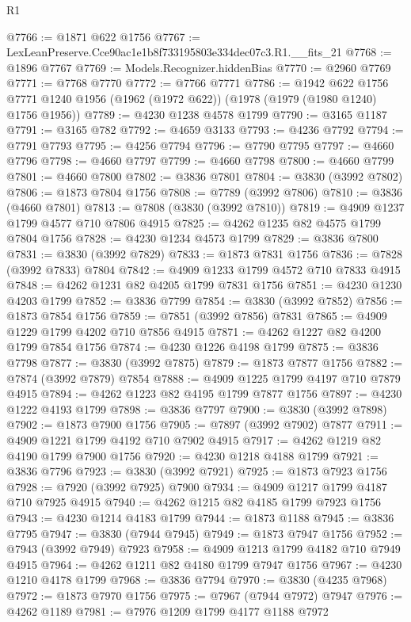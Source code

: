 \begin{lexlean}{R1}
\begin{coremodule}
@7766 := @1871 @622 @1756
@7767 := LexLeanPreserve.Cce90ac1e1b8f733195803e334dec07c3.R1.__fits_21
@7768 := @1896 @7767
@7769 := Models.Recognizer.hiddenBias
@7770 := @2960 @7769
@7771 := @7768 @7770
@7772 := @7766 @7771
@7786 := @1942
    @622
    @1756
    @7771
    @1240
    @1956
    (@1962 (@1972 @622))
    (@1978 (@1979 (@1980 @1240) @1756 @1956))
@7789 := @4230 @1238 @4578 @1799
@7790 := @3165 @1187
@7791 := @3165 @782
@7792 := @4659 @3133
@7793 := @4236 @7792
@7794 := @7791 @7793
@7795 := @4256 @7794
@7796 := @7790 @7795
@7797 := @4660 @7796
@7798 := @4660 @7797
@7799 := @4660 @7798
@7800 := @4660 @7799
@7801 := @4660 @7800
@7802 := @3836 @7801
@7804 := @3830 (@3992 @7802)
@7806 := @1873 @7804 @1756
@7808 := @7789 (@3992 @7806)
@7810 := @3836 (@4660 @7801)
@7813 := @7808 (@3830 (@3992 @7810))
@7819 := @4909 @1237 @1799 @4577 @710 @7806 @4915
@7825 := @4262 @1235 @82 @4575 @1799 @7804 @1756
@7828 := @4230 @1234 @4573 @1799
@7829 := @3836 @7800
@7831 := @3830 (@3992 @7829)
@7833 := @1873 @7831 @1756
@7836 := @7828 (@3992 @7833) @7804
@7842 := @4909 @1233 @1799 @4572 @710 @7833 @4915
@7848 := @4262 @1231 @82 @4205 @1799 @7831 @1756
@7851 := @4230 @1230 @4203 @1799
@7852 := @3836 @7799
@7854 := @3830 (@3992 @7852)
@7856 := @1873 @7854 @1756
@7859 := @7851 (@3992 @7856) @7831
@7865 := @4909 @1229 @1799 @4202 @710 @7856 @4915
@7871 := @4262 @1227 @82 @4200 @1799 @7854 @1756
@7874 := @4230 @1226 @4198 @1799
@7875 := @3836 @7798
@7877 := @3830 (@3992 @7875)
@7879 := @1873 @7877 @1756
@7882 := @7874 (@3992 @7879) @7854
@7888 := @4909 @1225 @1799 @4197 @710 @7879 @4915
@7894 := @4262 @1223 @82 @4195 @1799 @7877 @1756
@7897 := @4230 @1222 @4193 @1799
@7898 := @3836 @7797
@7900 := @3830 (@3992 @7898)
@7902 := @1873 @7900 @1756
@7905 := @7897 (@3992 @7902) @7877
@7911 := @4909 @1221 @1799 @4192 @710 @7902 @4915
@7917 := @4262 @1219 @82 @4190 @1799 @7900 @1756
@7920 := @4230 @1218 @4188 @1799
@7921 := @3836 @7796
@7923 := @3830 (@3992 @7921)
@7925 := @1873 @7923 @1756
@7928 := @7920 (@3992 @7925) @7900
@7934 := @4909 @1217 @1799 @4187 @710 @7925 @4915
@7940 := @4262 @1215 @82 @4185 @1799 @7923 @1756
@7943 := @4230 @1214 @4183 @1799
@7944 := @1873 @1188
@7945 := @3836 @7795
@7947 := @3830 (@7944 @7945)
@7949 := @1873 @7947 @1756
@7952 := @7943 (@3992 @7949) @7923
@7958 := @4909 @1213 @1799 @4182 @710 @7949 @4915
@7964 := @4262 @1211 @82 @4180 @1799 @7947 @1756
@7967 := @4230 @1210 @4178 @1799
@7968 := @3836 @7794
@7970 := @3830 (@4235 @7968)
@7972 := @1873 @7970 @1756
@7975 := @7967 (@7944 @7972) @7947
@7976 := @4262 @1189
@7981 := @7976 @1209 @1799 @4177 @1188 @7972

\end{coremodule}
\end{lexlean}
